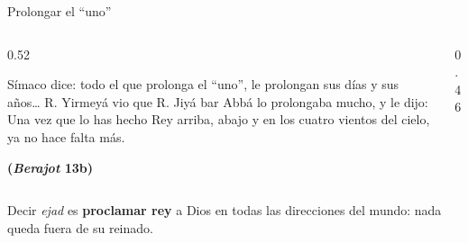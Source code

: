 \documentclass[hyperref={bookmarks=false},aspectratio=169]{beamer}
\newcommand{\heb}[1]{\mbox{\foreignlanguage{hebrew}{#1}}}
\newcommand{\fuente}[1]{\par\hfill{\upshape\bfseries\footnotesize\textcolor{azul}{#1}}}
\newcommand{\destacar}[1]{\textbf{\textcolor{azul}{#1}}}
\begin{document}
\begin{frame}{Prolongar el ``uno''}
\begin{columns}[c,onlytextwidth]
\begin{column}{0.52\textwidth}
\begin{cita}[colback=dorado!10!papiro,colframe=dorado!80!azul,fontupper=\scriptsize\itshape]Símaco dice: todo el que prolonga el ``uno'', le prolongan sus días y sus años\ldots{} R. Yirmeyá vio que R. Jiyá bar Abbá lo prolongaba mucho, y le dijo: Una vez que lo has hecho Rey arriba, abajo y en los cuatro vientos del cielo, ya no hace falta más.\fuente{(\emph{Berajot} 13b)}\end{cita}
\end{column}
\begin{column}{0.46\textwidth}
\centering
{}
\end{column}
\end{columns}\par\smallskip
\small Decir \emph{ejad} es \destacar{proclamar rey} a Dios en todas las direcciones del mundo: nada queda fuera de su reinado.
\end{frame}
\end{document}
